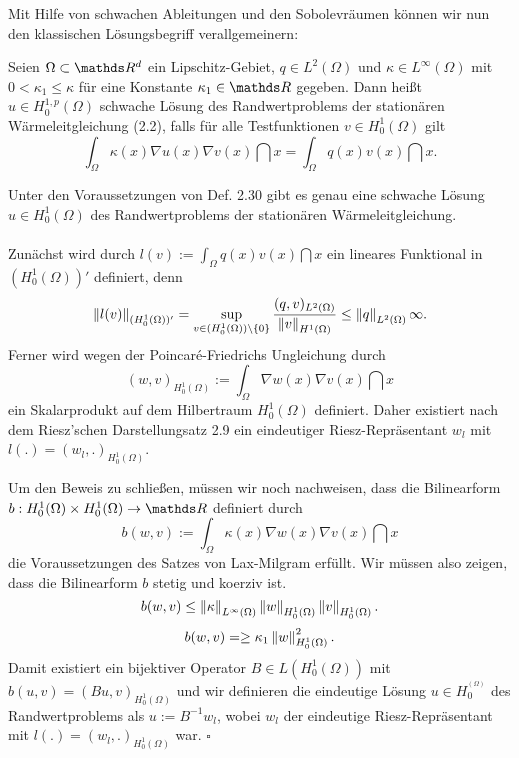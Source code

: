 Mit Hilfe von schwachen Ableitungen und den Sobolevräumen können wir nun den klassischen Lösungsbegriff verallgemeinern:

Seien $\Omega\subset \R^d$ ein Lipschitz-Gebiet, $q\in L^2(\Omega)$ und $\kappa \in L^\infty(\Omega)$ mit $0< \kappa_1 \le \kappa$ für eine Konstante $\kappa_1\in \R$ gegeben.
Dann heißt $u\in H_0^{1,p}(\Omega)$ schwache Lösung des Randwertproblems der stationären Wärmeleitgleichung (2.2), falls für alle Testfunktionen $v\in H_0^{1}(\Omega)$ gilt 
\[
\int_{\Omega} \kappa(x) \nabla u(x) \nabla v(x) \dint x = \int_{\Omega} q(x) v(x) \dint x.
\]

Unter den Voraussetzungen von Def. 2.30 gibt es genau eine schwache Lösung $u\in H_0^{1}(\Omega)$ des Randwertproblems der stationären Wärmeleitgleichung.\\

\\
Zunächst wird durch $l(v) := \int_{\Omega} q(x) v(x) \dint x$ ein lineares Funktional in $(H_0^{1}(\Omega))'$ definiert, denn
\[
\left\Vert l(v)\right\Vert_{(H_0^1(\Omega))'} = \sup\limits_{v\in (H_0^1(\Omega))\backslash \{0\}} \frac{(q,v)_{L^2(\Omega)}}{\left\Vert v\right\Vert_{H^1(\Omega)}} \le \left\Vert q\right\Vert_{L^2(\Omega)}  \infty.
\]
Ferner wird wegen der Poincaré-Friedrichs Ungleichung durch
\[
(w,v)_{H_0^1(\Omega)} := \int_{\Omega} \nabla w(x) \nabla v(x)\dint x
\]
ein Skalarprodukt auf dem Hilbertraum $H_0^1(\Omega)$ definiert.
Daher existiert nach dem Riesz'schen Darstellungsatz 2.9 ein eindeutiger Riesz-Repräsentant $w_l$ mit $l(.) = (w_l,.)_{H_0^1(\Omega)}$.

Um den Beweis zu schließen, müssen wir noch nachweisen, dass die Bilinearform $b:H_0^1(\Omega)\times H_0^1(\Omega) \to \R$ definiert durch
\[
b(w,v) := \int_{\Omega} \kappa(x) \nabla w(x) \nabla v(x) \dint x
\]
die Voraussetzungen des Satzes von Lax-Milgram erfüllt.
Wir müssen also zeigen, dass die Bilinearform $b$ stetig und koerziv ist.\\
\[
b(w,v) \le \left\Vert\kappa\right\Vert_{L^\infty(\Omega)} \left\Vert w\right\Vert_{H_0^1(\Omega)} \left\Vert v\right\Vert_{H_0^1(\Omega)}.
\]
\[
b(w,v) = \ge \kappa_1 \left\Vert w\right\Vert_{H_0^1(\Omega)}^2.
\]
Damit existiert ein bijektiver Operator $B\in L(H_0^1(\Omega))$ mit $b(u,v)= (Bu,v)_{H_0^1(\Omega)}$ und wir definieren die eindeutige Lösung $u\in H_0^^(\Omega)$ des Randwertproblems als $u := B^{-1}w_l$, wobei $w_l$ der eindeutige Riesz-Repräsentant mit $l(.)= (w_l,.)_{H_0^1(\Omega)}$ war.
\hfill $\square$

